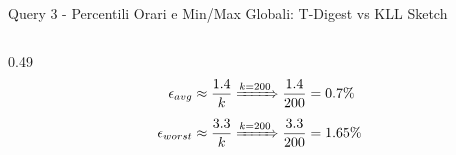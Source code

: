 \documentclass[10pt, aspectratio=169]{beamer}
\begin{document}
\begin{frame}[fragile, t]{Query 3 - Percentili Orari e Min/Max Globali: T-Digest vs KLL Sketch}
\begin{columns}[c]
\begin{column}{0.49\textwidth}
            {\footnotesize
                \[
                    \begin{aligned}
                        \epsilon_{avg} &\approx \frac{1.4}{k} \xRightarrow{k=200} \frac{1.4}{200} = 0.7\% \\[1ex]
                        \epsilon_{worst} &\approx \frac{3.3}{k} \xRightarrow{k=200} \frac{3.3}{200} = 1.65\%
                    \end{aligned}
                \]
            }

        \end{column}

    \end{columns}

\end{frame}
\end{document}
